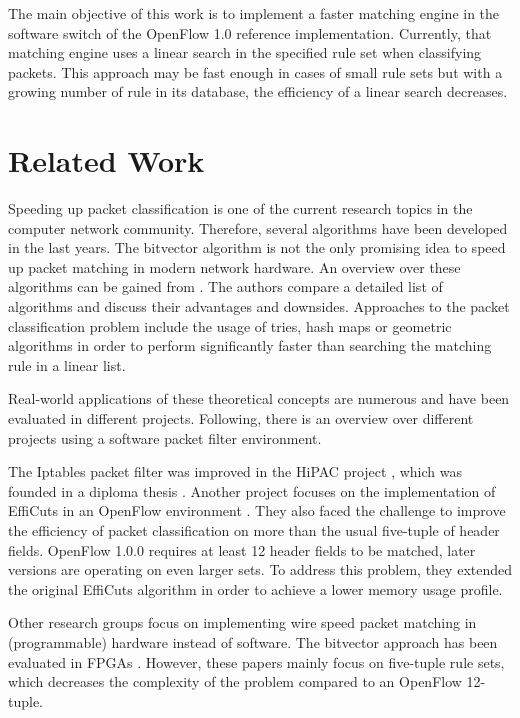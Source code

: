 \documentclass[a4paper,
		12pt,
		parskip=full,
		titlepage
		]{scrartcl}
\begin{document}
The main objective of this work is to implement a faster matching engine in the software switch of the OpenFlow 1.0 reference implementation.
Currently, that matching engine uses a linear search in the specified rule set when classifying packets.
This approach may be fast enough in cases of small rule sets but with a growing number of rule in its database, the efficiency of a linear search decreases.


\section{Related Work}
Speeding up packet classification is one of the current research topics in the computer network community.
Therefore, several algorithms have been developed in the last years.
The bitvector algorithm is not the only promising idea to speed up packet matching in modern network hardware.
An overview over these algorithms can be gained from \cite{algorithms_survey}.
The authors compare a detailed list of algorithms and discuss their advantages and downsides.
Approaches to the packet classification problem include the usage of tries, 
hash maps or geometric algorithms\cite{hicuts} in order to perform significantly 
faster than searching the matching rule in a linear list.

Real-world applications of these theoretical concepts are numerous and have been evaluated in different projects.
Following, there is an overview over different projects using a software packet filter environment.

The Iptables\cite{iptables} packet filter was improved in the HiPAC project \cite{hipac}, which was founded in a diploma thesis \cite{heinzhigh}.
Another project focuses on the implementation of EffiCuts in an OpenFlow environment \cite{stimpfling2013optimal}.
They also faced the challenge to improve the efficiency of packet classification on more than the usual five-tuple of header fields.
OpenFlow 1.0.0 \cite{openflow_spec10} requires at least 12 header fields to be matched, later versions are operating on even larger sets.
To address this problem, they extended the original EffiCuts algorithm in order to achieve a lower memory usage profile.

Other research groups focus on implementing wire speed packet matching in (programmable) hardware instead of software.
The bitvector approach \cite{bv} has been evaluated in FPGAs \cite{bitvector_fpga} \cite{qu2013fast}.
However, these papers mainly focus on five-tuple rule sets, which decreases the complexity of the problem compared to an OpenFlow 12-tuple.
\end{document}
